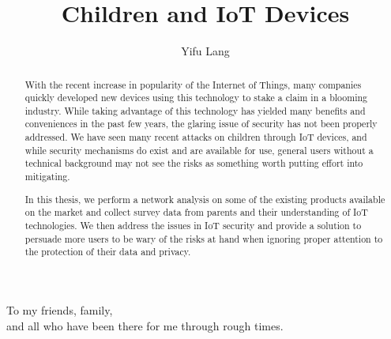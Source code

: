 \documentclass[12pt, draft]{ucthesis}
\begin{document}

\title{Children and IoT Devices}
\author{Yifu Lang}
\deanlinethree{}

\begin{frontmatter}

\maketitle
\copyrightpage

\tableofcontents
\listoffigures
\listoftables

\begin{abstract}
With the recent increase in popularity of the Internet of Things, many companies quickly developed new devices using this technology to stake a claim in a blooming industry. While taking advantage of this technology has yielded many benefits and conveniences in the past few years, the glaring issue of security has not been properly addressed. We have seen many recent attacks on children through IoT devices, and while security mechanisms do exist and are available for use, general users without a technical background may not see the risks as something worth putting effort into mitigating. 

In this thesis, we perform a network analysis on some of the existing products available on the market and collect survey data from parents and their understanding of IoT technologies. We then address the issues in IoT security and provide a solution to persuade more users to be wary of the risks at hand when ignoring proper attention to the protection of their data and privacy. 
\end{abstract}

\begin{dedication}
\null\vfil
{\large
\begin{center}
To my friends, family,\\\vspace{12pt}
and all who have been there for me through rough times.\\\vspace{12pt}
\end{center}}
\vfil\null
\end{dedication}


\end{frontmatter}
\end{document}
